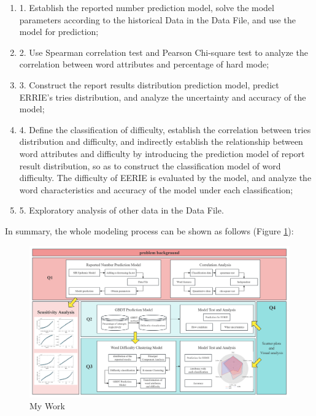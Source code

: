 \documentclass[
  journal=medium,
  manuscript=Report,
  year=2023,
  volume=37,
]{cup-journal}
\begin{document}
\begin{enumerate}
    
\item 1. Establish the reported number prediction model, solve the model parameters according to the historical Data in the Data File, and use the model for prediction;

\item 2. Use Spearman correlation test and Pearson Chi-square test to analyze the correlation between word attributes and percentage of hard mode;

\item 3. Construct the report results distribution prediction model, predict ERRIE's tries distribution, and analyze the uncertainty and accuracy of the model;

\item 4. Define the classification of difficulty, establish the correlation between tries distribution and difficulty, and indirectly establish the relationship between word attributes and difficulty by introducing the prediction model of report result distribution, so as to construct the classification model of word difficulty. The difficulty of EERIE is evaluated by the model, and analyze the word characteristics and accuracy of the model under each classification;

\item 5. Exploratory analysis of other data in the Data File.

\end{enumerate}

In summary, the whole modeling process can be shown as follows (Figure \ref{work}):

\begin{figure}[hbt!]
    \centering
    \includegraphics[width=\linewidth]{pic/our_work.png}
    \caption{My Work}
    \label{work}
\end{figure}
\end{document}
